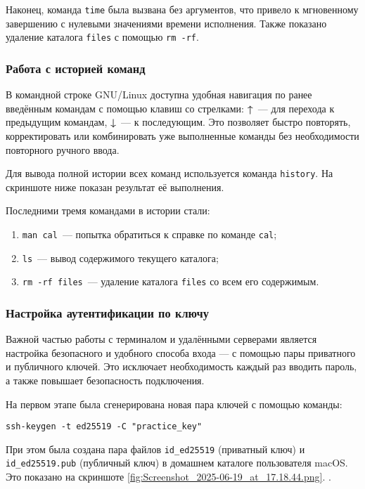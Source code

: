 Наконец, команда \texttt{time} была вызвана без аргументов, что привело к мгновенному завершению с нулевыми значениями времени исполнения. Также показано удаление каталога \texttt{files} с помощью \texttt{rm -rf}.

\subsubsection*{Работа с историей команд}

В командной строке GNU/Linux доступна удобная навигация по ранее введённым командам с помощью клавиш со стрелками: \textbf{↑}~— для перехода к предыдущим командам, \textbf{↓}~— к последующим. Это позволяет быстро повторять, корректировать или комбинировать уже выполненные команды без необходимости повторного ручного ввода.

Для вывода полной истории всех команд используется команда \texttt{history}. На скриншоте ниже показан результат её выполнения.

Последними тремя командами в истории стали:
\begin{enumerate}
    \item \texttt{man cal}~— попытка обратиться к справке по команде \texttt{cal};
    \item \texttt{ls}~— вывод содержимого текущего каталога;
    \item \texttt{rm -rf files}~— удаление каталога \texttt{files} со всем его содержимым.
\end{enumerate}


\subsubsection*{Настройка аутентификации по ключу}

Важной частью работы с терминалом и удалёнными серверами является настройка безопасного и удобного способа входа — с помощью пары приватного и публичного ключей. Это исключает необходимость каждый раз вводить пароль, а также повышает безопасность подключения.

На первом этапе была сгенерирована новая пара ключей с помощью команды:
\begin{verbatim}
ssh-keygen -t ed25519 -C "practice_key"
\end{verbatim}
При этом была создана пара файлов \verb|id_ed25519| (приватный ключ) и \verb|id_ed25519.pub| (публичный ключ) в домашнем каталоге пользователя macOS. Это показано на скриншоте \ref{fig:Screenshot_2025-06-19_at_17.18.44.png}.
.

